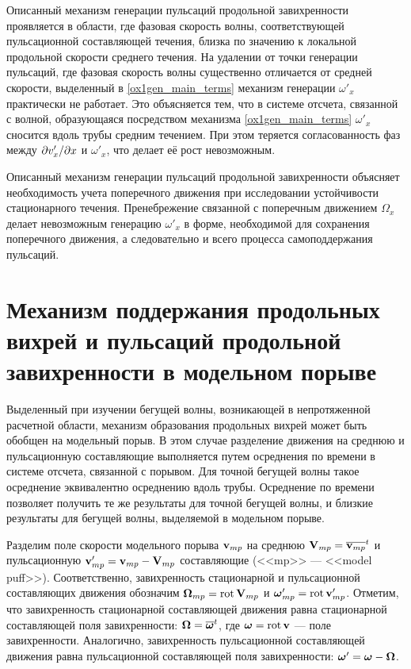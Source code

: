 Описанный механизм генерации пульсаций продольной завихренности проявляется в области, где фазовая скорость волны, соответствующей пульсационной составляющей течения, близка по значению к локальной продольной скорости среднего течения. На удалении от точки генерации пульсаций, где фазовая скорость волны существенно отличается от средней скорости, выделенный в \eqref{ox1gen_main_terms} механизм генерации $\omega'_x$ практически не работает. Это объясняется тем, что в системе отсчета, связанной с волной, образующаяся посредством механизма \eqref{ox1gen_main_terms} $\omega'_x$ сносится вдоль трубы средним течением. При этом теряется согласованность фаз между $\partial v'_x / \partial x$ и $\omega'_x$, что делает её рост невозможным. 

Описанный механизм генерации пульсаций продольной завихренности объясняет необходимость учета поперечного движения при исследовании устойчивости стационарного течения. Пренебрежение связанной с поперечным движением $\Omega_x$ делает невозможным генерацию $\omega'_x$ в форме, необходимой для сохранения поперечного движения, а следовательно и всего процесса самоподдержания пульсаций.


\section{Механизм поддержания продольных вихрей и пульсаций продольной завихренности в модельном порыве}

Выделенный при изучении бегущей волны, возникающей в непротяженной расчетной области, механизм образования продольных вихрей может быть обобщен на модельный порыв. В этом случае разделение движения на среднюю и пульсационную составляющие выполняется путем осреднения по времени в системе отсчета, связанной с порывом. Для точной бегущей волны такое осреднение эквивалентно осреднению вдоль трубы. Осреднение по времени позволяет получить те же результаты для точной бегущей волны, и близкие результаты для бегущей волны, выделяемой в модельном порыве. 

Разделим поле скорости модельного порыва $\mathbf{v}_{mp}$ на среднюю $\mathbf{V}_{mp} = \overline{\mathbf{v}_{mp}}^t$ и пульсационную $\mathbf{v}'_{mp} = \mathbf{v}_{mp} - \mathbf{V}_{mp}$ составляющие (<<mp>> --- <<model puff>>). Соответственно, завихренность стационарной и пульсационной составляющих движения обозначим $\mbox{\boldmath$\Omega$}_{mp} = \mathop{}\!\operatorname{rot} \mathbf{V}_{mp}$ и $\mbox{\boldmath$\omega$}'_{mp} = \mathop{}\!\operatorname{rot} \mathbf{v}'_{mp}$. Отметим, что завихренность стационарной составляющей движения равна стационарной составляющей поля завихренности: $\mbox{\boldmath$\Omega$} = \overline{\mbox{\boldmath$\omega$}}^t$, где $\mbox{\boldmath$\omega$} = \mathop{}\!\operatorname{rot} \mathbf{v}$ --- поле завихренности. Аналогично, завихренность пульсационной составляющей движения равна пульсационной составляющей поля завихренности: $\mbox{\boldmath$\omega$}' = \mbox{\boldmath$\omega$} - \mbox{\boldmath$\Omega$}$. 

